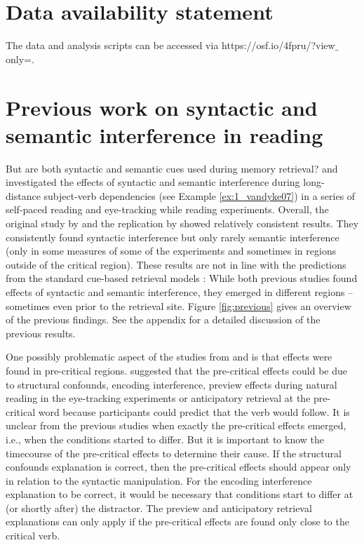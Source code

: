 \documentclass[a4paper, man, floatsintext]{apa7}
\begin{document}
\section{Data availability statement}

The data and analysis scripts can be accessed via https://osf.io/4fpru/?view$\_$only=.


\newpage
\printbibliography

\appendix 

\section{Previous work on syntactic and semantic interference in reading}

But are both syntactic and semantic cues used during memory retrieval? \citet{vandyke07} and \citet{mertzen} investigated the effects of syntactic and semantic interference during long-distance subject-verb dependencies (see Example \ref{ex:1_vandyke07}) in a series of self-paced reading and eye-tracking while reading experiments. Overall, the original study by \citet{vandyke07} and the replication by \citet{mertzen} showed relatively consistent results. They consistently found syntactic interference but only rarely semantic interference (only in some measures of some of the experiments and sometimes in regions outside of the critical region). These results are not in line with the predictions from the standard cue-based retrieval models \citep{Lewis2005, mcelree}: While both previous studies found effects of syntactic and semantic interference, they emerged in different regions -- sometimes even prior to the retrieval site. Figure \ref{fig:previous} gives an overview of the previous findings. See the appendix for a detailed discussion of the previous results.

One possibly problematic aspect of the studies from \citet{vandyke07} and \citet{mertzen} is that effects were found in pre-critical regions. \citet{mertzen} suggested that the pre-critical effects could be due to structural confounds, encoding interference, preview effects during natural reading in the eye-tracking experiments or anticipatory retrieval at the pre-critical word because participants could predict that the verb would follow. It is unclear from the previous studies when exactly the pre-critical effects emerged, i.e., when the conditions started to differ. But it is important to know the timecourse of the pre-critical effects to determine their cause. If the structural confounds explanation is correct, then the pre-critical effects should appear only in relation to the syntactic manipulation. For the encoding interference explanation to be correct, it would be necessary that conditions start to differ at (or shortly after) the distractor. The preview and anticipatory retrieval explanations can only apply if the pre-critical effects are found only close to the critical verb.
\end{document}
